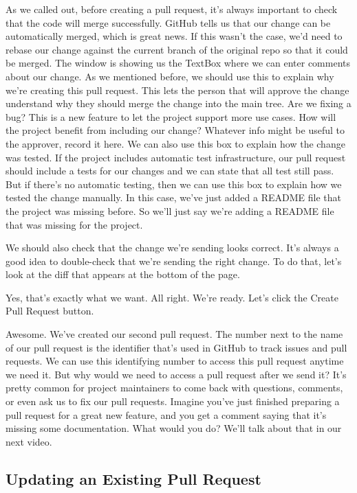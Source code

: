	As we called out, before creating a pull request, it's always important to check that the code will merge successfully. GitHub tells us that our change can be automatically merged, which is great news. If this wasn't the case, we'd need to rebase our change against the current branch of the original repo so that it could be merged. The window is showing us the TextBox where we can enter comments about our change. As we mentioned before, we should use this to explain why we're creating this pull request. This lets the person that will approve the change understand why they should merge the change into the main tree. Are we fixing a bug? This is a new feature to let the project support more use cases. How will the project benefit from including our change? Whatever info might be useful to the approver, record it here. We can also use this box to explain how the change was tested. If the project includes automatic test infrastructure, our pull request should include a tests for our changes and we can state that all test still pass. But if there's no automatic testing, then we can use this box to explain how we tested the change manually. In this case, we've just added a README file that the project was missing before. So we'll just say we're adding a README file that was missing for the project.
	
	We should also check that the change we're sending looks correct. It's always a good idea to double-check that we're sending the right change. To do that, let's look at the diff that appears at the bottom of the page.
	
	Yes, that's exactly what we want. All right. We're ready. Let's click the Create Pull Request button.
	
	Awesome. We've created our second pull request. The number next to the name of our pull request is the identifier that's used in GitHub to track issues and pull requests. We can use this identifying number to access this pull request anytime we need it. But why would we need to access a pull request after we send it? It's pretty common for project maintainers to come back with questions, comments, or even ask us to fix our pull requests. Imagine you've just finished preparing a pull request for a great new feature, and you get a comment saying that it's missing some documentation. What would you do? We'll talk about that in our next video.
	
	\subsection{Updating an Existing Pull Request}
	
